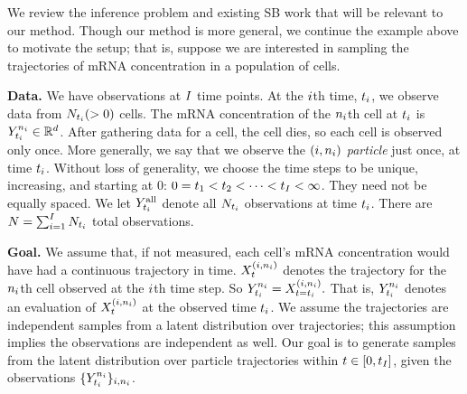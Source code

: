 We review the inference problem and existing SB work that will be relevant to our method. Though our method is more general, we continue the example above to motivate the setup; that is, suppose we are interested in sampling the trajectories of mRNA concentration in a population of cells.

\textbf{Data.}  We have observations at $I$ time points. At the $i$th time, $t_{i}$, we observe data from $N_{t_{i}}(> 0)$ cells. The mRNA concentration of the $n_{i}$th cell at $t_{i}$ is $\obsat{\timestep{\timeidx}}^{\sampleidx_{\timeidx}}\in \R^d$. After gathering data for a cell, the cell dies, so each cell is observed only once. More generally, we say that we observe the $(i, n_{i})$ \emph{particle} just once, at time $t_{i}$. Without loss of generality, we choose the time steps to be unique, increasing, and starting at 0: $0 =t_{1} < t_{2} < \dots < t_{I} < \infty$. They need not be equally spaced.
We let $\obsatall{\timestep{\timeidx}}$ denote all $N_{t_{i}}$ observations at time $t_{i}$. There are $N = \sum_{i=1}^I N_{t_{i}}$ total observations.

\textbf{Goal.} 
We assume that, if not measured, each cell's mRNA concentration would have had a continuous trajectory in time. $\responseat{\timet}^{(\timeidx, \sampleidx_{\timeidx}) }$ denotes the trajectory for the $n_{i}$th cell observed at the $i$th time step. So $\obsat{\timestep{\timeidx}}^{\sampleidx_{\timeidx}} = \responseat{\timet = \timestep{\timeidx}}^{ (\timeidx, \sampleidx_{\timeidx}) }.$ That is, $\obsat{\timestep{\timeidx}}^{\sampleidx_{\timeidx}}$ denotes an evaluation of $\responseat{\timet}^{ (\timeidx, \sampleidx_{\timeidx}) }$ at the observed time $t_{i}$. We assume the trajectories are independent samples from a latent distribution over trajectories; this assumption implies the observations are independent as well. Our goal is to generate samples from the latent distribution over particle trajectories within $t \in [0,t_{I}]$, given the observations $\{ \obsat{\timestep{\timeidx}}^{\sampleidx_{\timeidx}} \}_{\timeidx, \sampleidx_{\timeidx}}$.

